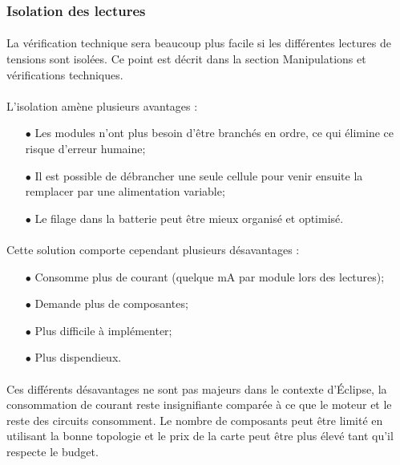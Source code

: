 	\newpage
	
	\subsubsection*{Isolation des lectures}
	\paragraph*{}
	La vérification technique sera beaucoup plus facile si les différentes lectures de tensions sont isolées. Ce point est décrit dans la section Manipulations et vérifications techniques. 
	
	\paragraph*{}
	L'isolation amène plusieurs avantages :
	
	\begin{itemize}
		\item[$\bullet$] Les modules n'ont plus besoin d'être branchés en ordre, ce qui élimine ce risque d'erreur humaine;
		\item[$\bullet$] Il est possible de débrancher une seule cellule pour venir ensuite la remplacer par une alimentation variable;
		\item[$\bullet$] Le filage dans la batterie peut être mieux organisé et optimisé.
	\end{itemize}

	\paragraph*{}
	Cette solution comporte cependant plusieurs désavantages :
	
	\begin{itemize}
		\item[$\bullet$] Consomme plus de courant (quelque mA par module lors des lectures);
		\item[$\bullet$] Demande plus de composantes;
		\item[$\bullet$] Plus difficile à implémenter;
		\item[$\bullet$] Plus dispendieux.
	\end{itemize}
	
	\paragraph*{}
	Ces différents désavantages ne sont pas majeurs dans le contexte d'Éclipse, la consommation de courant reste insignifiante comparée à ce que le moteur et le reste des circuits consomment. Le nombre de composants peut être limité en utilisant la bonne topologie et le prix de la carte peut être plus élevé tant qu'il respecte le budget. 
	
